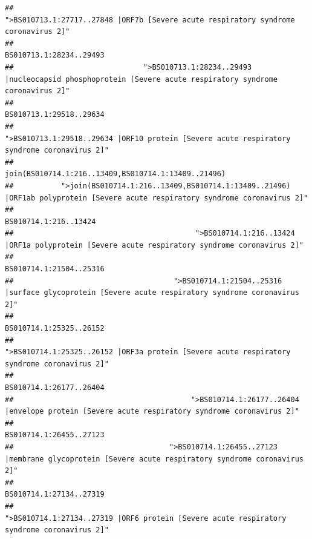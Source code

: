 \documentclass[
]{article}
\begin{document}
\begin{verbatim}
##                                                    ">BS010713.1:27717..27848 |ORF7b [Severe acute respiratory syndrome coronavirus 2]" 
##                                                                                                                BS010713.1:28234..29493 
##                              ">BS010713.1:28234..29493 |nucleocapsid phosphoprotein [Severe acute respiratory syndrome coronavirus 2]" 
##                                                                                                                BS010713.1:29518..29634 
##                                            ">BS010713.1:29518..29634 |ORF10 protein [Severe acute respiratory syndrome coronavirus 2]" 
##                                                                                    join(BS010714.1:216..13409,BS010714.1:13409..21496) 
##           ">join(BS010714.1:216..13409,BS010714.1:13409..21496) |ORF1ab polyprotein [Severe acute respiratory syndrome coronavirus 2]" 
##                                                                                                                  BS010714.1:216..13424 
##                                          ">BS010714.1:216..13424 |ORF1a polyprotein [Severe acute respiratory syndrome coronavirus 2]" 
##                                                                                                                BS010714.1:21504..25316 
##                                     ">BS010714.1:21504..25316 |surface glycoprotein [Severe acute respiratory syndrome coronavirus 2]" 
##                                                                                                                BS010714.1:25325..26152 
##                                            ">BS010714.1:25325..26152 |ORF3a protein [Severe acute respiratory syndrome coronavirus 2]" 
##                                                                                                                BS010714.1:26177..26404 
##                                         ">BS010714.1:26177..26404 |envelope protein [Severe acute respiratory syndrome coronavirus 2]" 
##                                                                                                                BS010714.1:26455..27123 
##                                    ">BS010714.1:26455..27123 |membrane glycoprotein [Severe acute respiratory syndrome coronavirus 2]" 
##                                                                                                                BS010714.1:27134..27319 
##                                             ">BS010714.1:27134..27319 |ORF6 protein [Severe acute respiratory syndrome coronavirus 2]" 

\end{verbatim}
\end{document}
